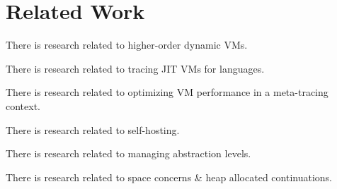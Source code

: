 \chapter{Related Work}

    \begin{chapterpoint}
        There is research related to higher-order dynamic VMs.

        There is research related to tracing JIT VMs for languages.

        There is research related to optimizing VM performance in a meta-tracing context.

        There is research related to self-hosting.

        There is research related to managing abstraction levels.

        There is research related to space concerns \& heap allocated continuations.

    \end{chapterpoint}